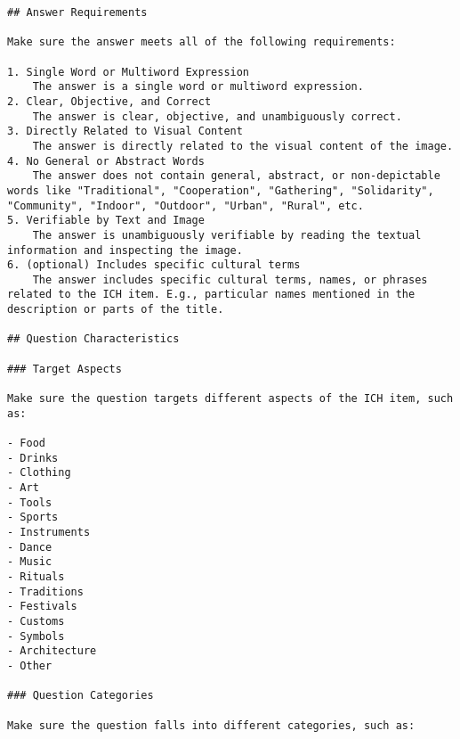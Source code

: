 \begin{tcolorbox}[
    enhanced, 
    breakable,
    skin first=enhanced,
    skin middle=enhanced,
    skin last=enhanced,
]
\begin{verbatim}
## Answer Requirements

Make sure the answer meets all of the following requirements:

1. Single Word or Multiword Expression
    The answer is a single word or multiword expression.
2. Clear, Objective, and Correct
    The answer is clear, objective, and unambiguously correct.
3. Directly Related to Visual Content
    The answer is directly related to the visual content of the image.
4. No General or Abstract Words
    The answer does not contain general, abstract, or non-depictable words like "Traditional", "Cooperation", "Gathering", "Solidarity", "Community", "Indoor", "Outdoor", "Urban", "Rural", etc.
5. Verifiable by Text and Image
    The answer is unambiguously verifiable by reading the textual information and inspecting the image.
6. (optional) Includes specific cultural terms
    The answer includes specific cultural terms, names, or phrases related to the ICH item. E.g., particular names mentioned in the description or parts of the title.

## Question Characteristics

### Target Aspects

Make sure the question targets different aspects of the ICH item, such as:

- Food
- Drinks
- Clothing
- Art
- Tools
- Sports
- Instruments
- Dance
- Music
- Rituals
- Traditions
- Festivals
- Customs
- Symbols
- Architecture
- Other

### Question Categories

Make sure the question falls into different categories, such as:


\end{verbatim}
\end{tcolorbox}
